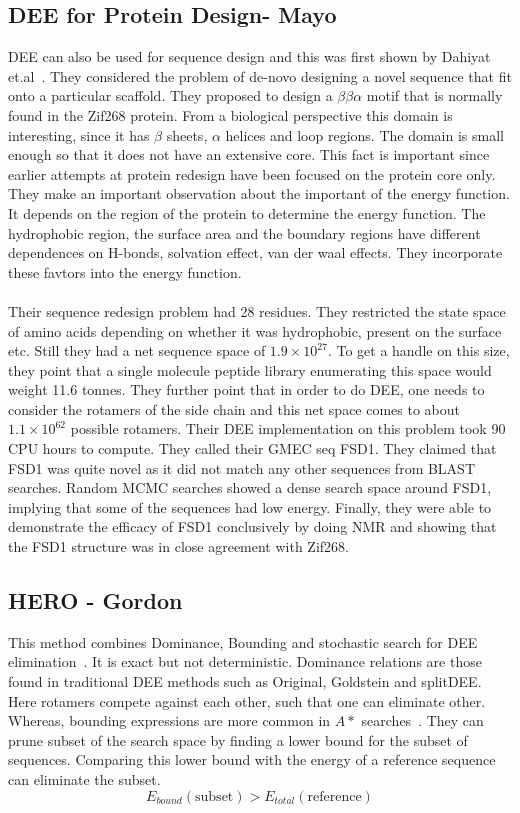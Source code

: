 \documentclass{article}
\begin{document}
\subsection{DEE for Protein Design- Mayo}
DEE can also be used for sequence design and this was first shown by Dahiyat et.al~\cite{Dahiyat1997}. They considered the problem of de-novo designing a novel sequence that fit onto a particular scaffold. They proposed to design a $\beta\beta\alpha$ motif that is normally found in the Zif268 protein. 
From a biological perspective this domain is interesting, since it has $\beta$ sheets, $\alpha$ helices and loop regions. The domain is small enough so that it does not have an extensive core. 
This fact is important since earlier attempts at protein redesign have been focused on the protein core only. 
They make an important observation about the important of the energy function. It depends on the region of the protein to determine the energy function. The hydrophobic region, the surface area and the boundary regions have different dependences on H-bonds, solvation effect, van der waal effects. 
They incorporate these favtors into the energy function. 
\\
\\
Their sequence redesign problem had 28 residues. They restricted the state space of amino acids depending on whether it was hydrophobic, present on the surface etc. Still they had a net sequence space of $1.9 \times 10^{27}$. To get a handle on this size, they point that a single molecule peptide library enumerating this space would weight 11.6 tonnes. They further point that in order to do DEE, one needs to consider the rotamers of the side chain and this net space comes to about $1.1 \times 10^{62}$ possible rotamers. 
Their DEE implementation on this problem took 90 CPU hours to compute. They called their GMEC seq FSD1. They claimed that FSD1 was quite novel as it did not match any other sequences from BLAST searches. Random MCMC searches showed a dense search space around FSD1, implying that some of the sequences had low energy. 
Finally, they were able to demonstrate the efficacy of FSD1 conclusively by doing NMR and showing that the FSD1 structure was in close agreement with Zif268.

\subsection{HERO - Gordon}
This method combines Dominance, Bounding and stochastic search for DEE elimination~\cite{Gordon2003}. It is exact but not deterministic. Dominance relations are those found in traditional DEE methods such as Original, Goldstein and splitDEE. Here rotamers compete against each other, such that one can eliminate other. Whereas, bounding expressions are more common in $A*$ searches~\cite{Leach1998}. 
They can prune subset of the search space by finding a lower bound for the subset of sequences. Comparing this lower bound with the energy of a reference sequence can eliminate the subset. 
\[
	E_{bound}(\mathrm{subset}) > E_{total}(\mathrm{reference})
\]
\end{document}
